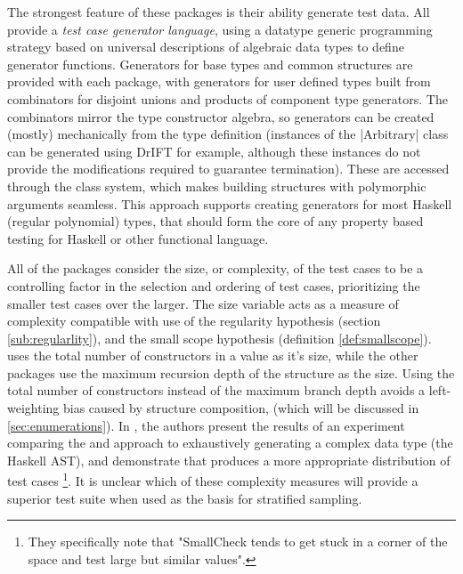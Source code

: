 The strongest feature of these packages is their ability generate test data.
All provide a \emph{test case generator language}, 
using a datatype generic programming strategy based on 
universal descriptions of algebraic data types
to define generator functions.
Generators for base types and common structures are provided with each package,
with generators for user defined types built from 
combinators for disjoint unions and products of component type generators.
The combinators mirror the type constructor algebra,
so generators can be created (mostly) mechanically from the type definition
(instances of the \QC |Arbitrary| class can be generated using DrIFT for example,
although these instances do not provide the 
modifications required to guarantee termination).
These are accessed through the class system,
which makes building structures with polymorphic arguments seamless.
This approach supports creating generators for most Haskell (regular polynomial) types,
that should form the core of any property based testing for Haskell or other functional language.

All of the packages consider the size, or complexity,
of the test cases to be a controlling factor in
the selection and ordering of test cases,
prioritizing the smaller test cases over the larger.
The size variable acts as a measure of complexity
compatible with use of the regularity hypothesis (section \ref{sub:regularlity}),
and the small scope hypothesis (definition \ref{def:smallscope}).
\FEAT uses the total number of constructors in a value as it's size,
while the other packages use the maximum recursion depth of the structure as the size.
Using the total number of constructors instead of the maximum branch depth
avoids a left-weighting bias caused by structure composition,
(which will be discussed in \ref{sec:enumerations}).
In \cite{Duregard2012}, the authors present the results of an experiment
comparing the \SC and \FEAT approach to 
exhaustively generating a complex data type (the Haskell AST),
and demonstrate that \FEAT produces a more appropriate distribution of test cases
\footnote{They specifically note that 
"SmallCheck tends to get stuck in a corner of the space and test large but similar values".}.
It is unclear which of these complexity measures will provide a superior test suite
when used as the basis for stratified sampling.

